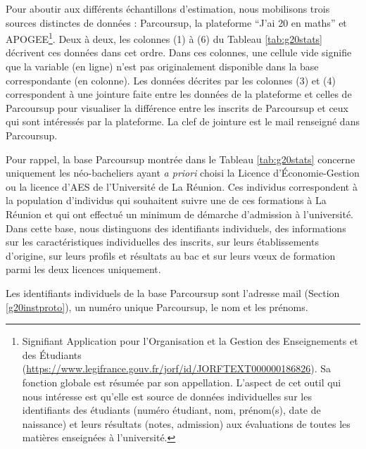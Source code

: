 \documentclass[
]{book}
\begin{document}
Pour aboutir aux différents échantillons d'estimation, nous mobilisons trois sources distinctes de données : Parcoursup, la plateforme ``J'ai 20 en maths'' et APOGEE\footnote{Signifiant Application pour l'Organisation et la Gestion des Enseignements et des Étudiants (\url{https://www.legifrance.gouv.fr/jorf/id/JORFTEXT000000186826}). Sa fonction globale est résumée par son appellation. L'aspect de cet outil qui nous intéresse est qu'elle est source de données individuelles sur les identifiants des étudiants (numéro étudiant, nom, prénom(s), date de naissance) et leurs résultats (notes, admission) aux évaluations de toutes les matières enseignées à l'université.}. Deux à deux, les colonnes (1) à (6) du Tableau \ref{tab:g20stats} décrivent ces données dans cet ordre. Dans ces colonnes, une cellule vide signifie que la variable (en ligne) n'est pas originalement disponible dans la base correspondante (en colonne). Les données décrites par les colonnes (3) et (4) correspondent à une jointure faite entre les données de la plateforme et celles de Parcoursup pour visualiser la différence entre les inscrits de Parcoursup et ceux qui sont intéressés par la plateforme. La clef de jointure est le mail renseigné dans Parcoursup.

\quad Pour rappel, la base Parcoursup montrée dans le Tableau \ref{tab:g20stats} concerne uniquement les néo-bacheliers ayant \emph{a priori} choisi la Licence d'Économie-Gestion ou la licence d'AES de l'Université de La Réunion. Ces individus correspondent à la population d'individus qui souhaitent suivre une de ces formations à La Réunion et qui ont effectué un minimum de démarche d'admission à l'université.\\
Dans cette base, nous distinguons des identifiants individuels, des informations sur les caractéristiques individuelles des inscrits, sur leurs établissements d'origine, sur leurs profils et résultats au bac et sur leurs vœux de formation parmi les deux licences uniquement.

Les identifiants individuels de la base Parcoursup sont l'adresse mail (Section \ref{g20instproto}), un numéro unique Parcoursup, le nom et les prénoms.
\end{document}

